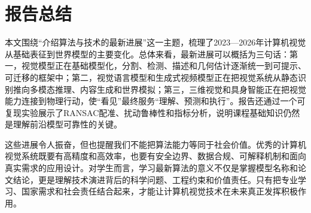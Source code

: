 \documentclass[UTF8,a4paper,12pt]{ctexart}
\begin{document}
\section{报告总结}
本文围绕“介绍算法与技术的最新进展”这一主题，梳理了2023—2026年计算机视觉从基础表征到世界模型的主要变化。总体来看，最新进展可以概括为三句话：第一，视觉模型正在基础模型化，分割、检测、描述和几何估计逐渐统一到可提示、可迁移的框架中；第二，视觉语言模型和生成式视频模型正在把视觉系统从静态识别推向多模态推理、内容生成和世界模拟；第三，三维视觉和具身智能正在把视觉能力连接到物理行动，使“看见”最终服务“理解、预测和执行”。报告还通过一个可复现实验展示了RANSAC配准、扰动鲁棒性和指标分析，说明课程基础知识仍然是理解前沿模型可靠性的关键。

这些进展令人振奋，但也提醒我们不能把算法能力等同于社会价值。优秀的计算机视觉系统既要有高精度和高效率，也要有安全边界、数据合规、可解释机制和面向真实需求的应用设计。对学生而言，学习最新算法的意义不仅是掌握模型名称和论文结论，更是理解技术演进背后的科学问题、工程约束和价值责任。只有把专业学习、国家需求和社会责任结合起来，才能让计算机视觉技术在未来真正发挥积极作用。
\end{document}
